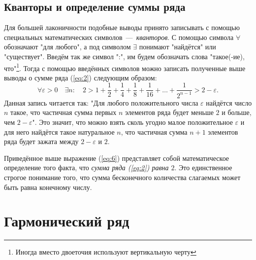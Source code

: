\documentclass[12pt]{article}
\begin{document}
\subsection{Кванторы и определение суммы ряда}
Для большей лаконичности подобные выводы принято записывать с помощью специальных математических символов~\----~\emph{кванторов}. С помощью символа $\forall$ обозначают "для любого"{}, а под символом $\exists$ понимают "найдётся"{} или "существует"{}. Введём так же символ ":"{}, им будем обозначать слова "такое(\--ие), что"{}\footnote{Иногда вместо двоеточия используют вертикальную черту}. Тогда с помощью введённых символов можно записать полученные выше выводы о сумме ряда (\ref{eq:2}) следующим образом:
\begin{equation}\label{eq:6}
    \forall \varepsilon > 0 \quad \exists n: \quad 2 > 1 + \dfrac{1}{2} + \dfrac14 + \dfrac18 + \dfrac{1}{16} + \ldots + \dfrac1{2^{n-1}} > 2 - \varepsilon.
\end{equation}
Данная запись читается так: "Для любого положительного числа $\varepsilon$ найдётся число $n$ такое, что частичная сумма первых $n$ элементов ряда будет меньше $2$ и больше, чем $2-\varepsilon$"{}. Это значит, что можно взять сколь угодно малое положительное $\varepsilon$ и для него найдётся такое натуральное $n$, что частичная сумма $n+1$ элементов ряда будет зажата между $2-\varepsilon$ и $2$.
\par
Приведённое выше выражение (\ref{eq:6}) представляет собой математическое определение того факта, что \emph{сумма ряда (\ref{eq:2}) равна $2$}. Это единственное строгое понимание того, что сумма бесконечного количества слагаемых может быть равна конечному числу.
\section{Гармонический ряд}
\end{document}
